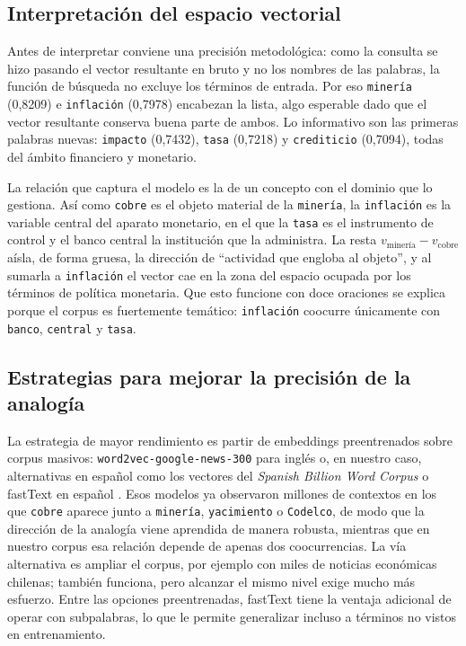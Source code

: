 \documentclass[12pt, a4paper]{article}
\newcommand{\code}[1]{\texttt{#1}}
\begin{document}
\subsection{Interpretación del espacio vectorial}

Antes de interpretar conviene una precisión metodológica: como la consulta se hizo pasando el vector
resultante en bruto y no los nombres de las palabras, la función de búsqueda no excluye los términos
de entrada. Por eso \code{minería} (0,8209) e \code{inflación} (0,7978) encabezan la lista, algo
esperable dado que el vector resultante conserva buena parte de ambos. Lo informativo son las
primeras palabras nuevas: \code{impacto} (0,7432), \code{tasa} (0,7218) y \code{crediticio} (0,7094),
todas del ámbito financiero y monetario.

La relación que captura el modelo es la de un concepto con el dominio que lo gestiona. Así como
\code{cobre} es el objeto material de la \code{minería}, la \code{inflación} es la variable central
del aparato monetario, en el que la \code{tasa} es el instrumento de control y el banco central la
institución que la administra. La resta $v_{\text{minería}} - v_{\text{cobre}}$ aísla, de forma
gruesa, la dirección de ``actividad que engloba al objeto'', y al sumarla a \code{inflación} el
vector cae en la zona del espacio ocupada por los términos de política monetaria. Que esto funcione
con doce oraciones se explica porque el corpus es fuertemente temático: \code{inflación} coocurre
únicamente con \code{banco}, \code{central} y \code{tasa}.

\subsection{Estrategias para mejorar la precisión de la analogía}

La estrategia de mayor rendimiento es partir de embeddings preentrenados sobre corpus masivos:
\code{word2vec-google-news-300} para inglés o, en nuestro caso, alternativas en español como los
vectores del \textit{Spanish Billion Word Corpus} o fastText en español
\citep{bojanowski2017enriching}. Esos modelos ya observaron millones de contextos en los que
\code{cobre} aparece junto a \code{minería}, \code{yacimiento} o \code{Codelco}, de modo que la
dirección de la analogía viene aprendida de manera robusta, mientras que en nuestro corpus esa
relación depende de apenas dos coocurrencias. La vía alternativa es ampliar el corpus, por ejemplo
con miles de noticias económicas chilenas; también funciona, pero alcanzar el mismo nivel exige mucho
más esfuerzo. Entre las opciones preentrenadas, fastText tiene la ventaja adicional de operar con
subpalabras, lo que le permite generalizar incluso a términos no vistos en entrenamiento.
\end{document}

